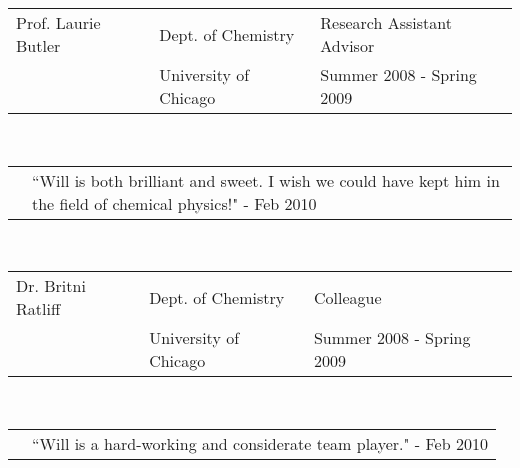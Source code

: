 \documentclass{article}
\newcommand{\q}{$\quad$ \newline}
\newcommand{\vl}{4.25}
\newcommand{\wl}{8.4}
\newcommand{\ww}{13}
\begin{document}
\noindent \begin{tabular}{@{}p{\vl cm}p{\wl cm}l@{}}
Prof. Laurie Butler & Dept. of Chemistry & Research Assistant Advisor \\
& University of Chicago & Summer 2008 - Spring 2009
\end{tabular} \q \q

\noindent \begin{tabular}{@{}p{\vl cm}p{\ww cm}@{}}
&``Will is both brilliant and sweet. I wish we could have kept him in the field of chemical physics!" - Feb 2010
\end{tabular} \q \q

\noindent \begin{tabular}{@{}p{\vl cm}p{\wl cm}l@{}}
Dr. Britni Ratliff & Dept. of Chemistry & Colleague \\
& University of Chicago & Summer 2008 - Spring 2009
\end{tabular} \q \q

\noindent \begin{tabular}{@{}p{\vl cm}p{\ww cm}@{}}
&``Will is a hard-working and considerate team player." - Feb 2010
\end{tabular}
\end{document}
